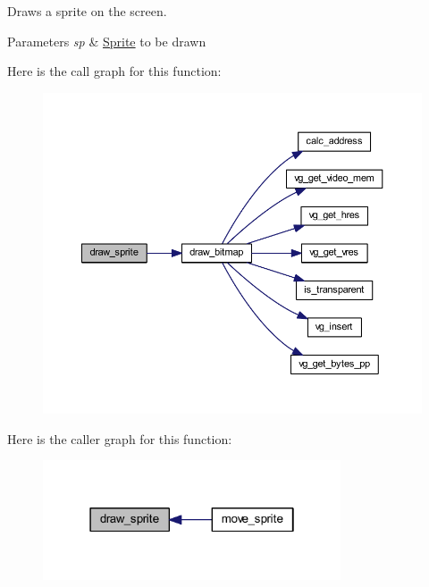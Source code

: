 Draws a sprite on the screen. 


\begin{DoxyParams}{Parameters}
{\em sp} & \mbox{\hyperlink{struct_sprite}{Sprite}} to be drawn \\
\hline
\end{DoxyParams}
Here is the call graph for this function\+:\nopagebreak
\begin{figure}[H]
\begin{center}
\leavevmode
\includegraphics[width=350pt]{group__sprite_ga740994f8c16c38bf18eaabac1f5eeeb9_cgraph}
\end{center}
\end{figure}
Here is the caller graph for this function\+:\nopagebreak
\begin{figure}[H]
\begin{center}
\leavevmode
\includegraphics[width=250pt]{group__sprite_ga740994f8c16c38bf18eaabac1f5eeeb9_icgraph}
\end{center}
\end{figure}
\mbox{\label{group__sprite_gab5aa8ee6efdb9ebf62df81cad24c445c}} 
